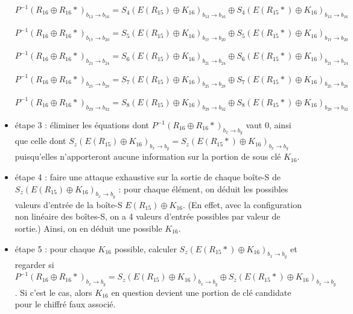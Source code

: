 \documentclass[11pt]{article}
\begin{document}
\begin{itemize}
	$P^{-1}(R_{16}\oplus R_{16}*)_{b_{13}\to b_{16}} = S_4(E(R_{15})\oplus K_{16})_{b_{13}\to b_{16}} \oplus S_4(E(R_{15}*)\oplus K_{16})_{b_{13}\to b_{16}}$
			
	$P^{-1}(R_{16}\oplus R_{16}*)_{b_{17}\to b_{20}} = S_5(E(R_{15})\oplus K_{16})_{b_{17}\to b_{20}} \oplus S_5(E(R_{15}*)\oplus K_{16})_{b_{17}\to b_{20}}$
				
	$P^{-1}(R_{16}\oplus R_{16}*)_{b_{21}\to b_{24}} = S_6(E(R_{15})\oplus K_{16})_{b_{21}\to b_{24}} \oplus S_6(E(R_{15}*)\oplus K_{16})_{b_{21}\to b_{24}}$
					
	$P^{-1}(R_{16}\oplus R_{16}*)_{b_{25}\to b_{28}} = S_7(E(R_{15})\oplus K_{16})_{b_{25}\to b_{28}} \oplus S_7(E(R_{15}*)\oplus K_{16})_{b_{25}\to b_{28}}$
						
	$P^{-1}(R_{16}\oplus R_{16}*)_{b_{29}\to b_{32}} = S_8(E(R_{15})\oplus K_{16})_{b_{29}\to b_{32}} \oplus S_8(E(R_{15}*)\oplus K_{16})_{b_{29}\to b_{32}}$ \newline
	
	\item étape 3 : éliminer les équations dont $P^{-1}(R_{16}\oplus R_{16}*)_{b_x\to b_y}$ vaut $0$, ainsi que celle dont $S_z(E(R_{15})\oplus K_{16})_{b_{x}\to b_{y}} = S_z(E(R_{15}*)\oplus K_{16})_{b_{x}\to b_{y}}$ puisqu'elles n'apporteront aucune information sur la portion de sous clé $K_{16}$. \newline
	
	\item étape 4 : faire une attaque exhaustive sur la sortie de chaque boîte-S de \newline $S_z(E(R_{15})\oplus K_{16})_{b_{x}\to b_{y}}$ : pour chaque élément, on déduit les possibles valeurs d'entrée de la boîte-S $E(R_{15})\oplus K_{16}$. (En effet, avec la configuration non linéaire des boîtes-S, on a 4 valeurs d'entrée possibles par valeur de sortie.) Ainsi, on en déduit une possible $K_{16}$. \newline
	
	\item étape 5 : pour chaque $K_{16}$ possible, calculer $S_z(E(R_{15}*)\oplus K_{16})_{b_{x}\to b_{y}}$ et regarder si \newline $P^{-1}(R_{16}\oplus R_{16}*)_{b_{x}\to b_{y}} = S_z(E(R_{15})\oplus K_{16})_{b_{x}\to b_{y}} \oplus S_z(E(R_{15}*)\oplus K_{16})_{b_{x}\to b_{y}}$. Si c'est le cas, alors $K_{16}$ en question devient une portion de clé candidate pour le chiffré faux associé. \newline
	

\end{itemize}
\end{document}
